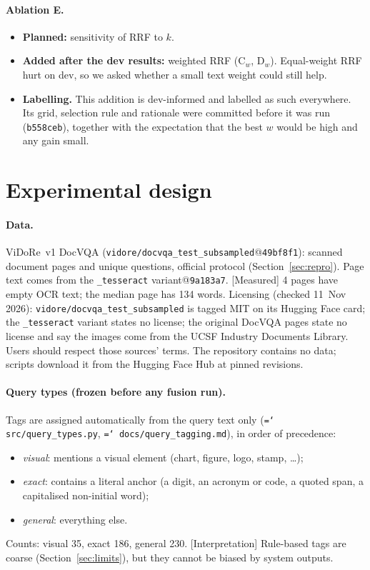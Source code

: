 \documentclass[11pt,a4paper]{article}
\newcommand{\lbl}[2]{\textsf{\scriptsize\textcolor{#1}{[#2]}}}
\newcommand{\Int}{\lbl{tagI}{Interpretation}}
\newcommand{\Mea}{\lbl{tagM}{Measured}}
\newcommand{\file}[1]{\texttt{\small\hyphenchar\font=`\/ #1}}
\begin{document}
\paragraph{Ablation E.}
\begin{itemize}
  \item \textbf{Planned:} sensitivity of RRF to $k$.
  \item \textbf{Added after the dev results:} weighted RRF (C$_w$, D$_w$). Equal-weight RRF hurt on dev, so we asked whether a small text weight could still help.
  \item \textbf{Labelling.} This addition is dev-informed and labelled as such everywhere. Its grid, selection rule and rationale were committed before it was run (\texttt{b558ceb}), together with the expectation that the best $w$ would be high and any gain small.
\end{itemize}

\section{Experimental design}
\label{sec:design}

\paragraph{Data.}
ViDoRe~v1 DocVQA (\texttt{vidore/docvqa\_test\_subsampled}@\texttt{49bf8f1}): \nPages{} scanned document pages and \nQueries{} unique questions, official protocol (Section~\ref{sec:repro}). Page text comes from the \texttt{\_tesseract} variant@\texttt{9a183a7}. \Mea{} 4 pages have empty OCR text; the median page has 134 words.
Licensing (checked 11~Nov 2026): \texttt{vidore/docvqa\_test\_subsampled} is tagged MIT on its Hugging Face card; the \texttt{\_tesseract} variant states no license; the original DocVQA pages state no license and say the images come from the UCSF Industry Documents Library. Users should respect those sources' terms. The repository contains no data; scripts download it from the Hugging Face Hub at pinned revisions.

\paragraph{Query types (frozen before any fusion run).}
Tags are assigned automatically from the query text only (\file{src/query\_types.py}, \file{docs/query\_tagging.md}), in order of precedence:
\begin{itemize}
  \item \emph{visual}: mentions a visual element (chart, figure, logo, stamp, \dots);
  \item \emph{exact}: contains a literal anchor (a digit, an acronym or code, a quoted span, a capitalised non-initial word);
  \item \emph{general}: everything else.
\end{itemize}
Counts: visual 35, exact 186, general 230. \Int{} Rule-based tags are coarse (Section~\ref{sec:limits}), but they cannot be biased by system outputs.
\end{document}
